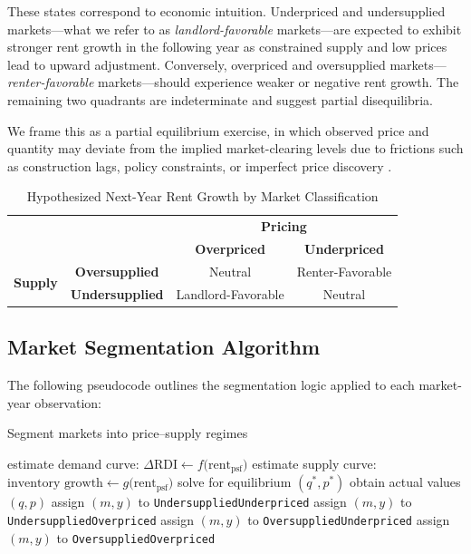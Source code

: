 \documentclass[APA,Times1COL]{WileyNJDv5} %
\begin{document}
These states correspond to economic intuition. Underpriced and undersupplied markets---what we refer to as \textit{landlord-favorable} markets---are expected to exhibit stronger rent growth in the following year as constrained supply and low prices lead to upward adjustment. Conversely, overpriced and oversupplied markets---\textit{renter-favorable} markets---should experience weaker or negative rent growth. The remaining two quadrants are indeterminate and suggest partial disequilibria.

We frame this as a partial equilibrium exercise, in which observed price and quantity may deviate from the implied market-clearing levels due to frictions such as construction lags, policy constraints, or imperfect price discovery \cite{wheaton1991realestate, glaeser2019rethinking}.

\begin{table}[h!]
	\centering
	\caption*{Hypothesized Next-Year Rent Growth by Market Classification}
	\begin{tabular}{cc|c|c|}
		\multicolumn{2}{c}{} & \multicolumn{2}{c}{\textbf{Pricing}} \\
		\multicolumn{2}{c}{} & \textbf{Overpriced} & \textbf{Underpriced} \\
		\cmidrule{3-4}
		\multirow{2}{*}{\textbf{Supply}} & \textbf{Oversupplied} & Neutral & Renter-Favorable \\
		\cmidrule{2-4}
		& \textbf{Undersupplied} & Landlord-Favorable & Neutral \\
		\bottomrule
	\end{tabular}
\end{table}

\subsection{Market Segmentation Algorithm}

The following pseudocode outlines the segmentation logic applied to each market-year observation:
\begin{algorithm}
\caption{\enskip Segment markets into price–supply regimes}\label{alg:market_segmentation}
\begin{algorithmic}
    \State estimate demand curve: $\Delta\text{RDI} \gets f\!\bigl(\text{rent}_{\text{psf}}\bigr)$
    \State estimate supply curve: $\text{inventory growth} \gets g\!\bigl(\text{rent}_{\text{psf}}\bigr)$
    \State solve for equilibrium $(q^{\ast},p^{\ast})$
    \State obtain actual values $(q,p)$
        \State assign $(m,y)$ to \texttt{UndersuppliedUnderpriced}
      \Else
        \State assign $(m,y)$ to \texttt{UndersuppliedOverpriced}
      \EndIf
    \Else
        \State assign $(m,y)$ to \texttt{OversuppliedUnderpriced}
      \Else
        \State assign $(m,y)$ to \texttt{OversuppliedOverpriced}
      \EndIf
    \EndIf
  \EndFor
\EndFor
\end{algorithmic}
\end{algorithm}
\end{document}
